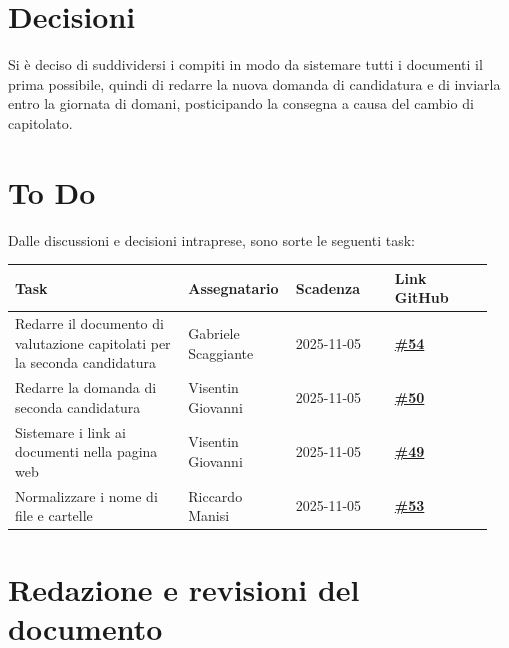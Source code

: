 \documentclass[a4paper,12pt]{article}
\begin{document}
	\section{Decisioni}
	Si \`e deciso di suddividersi i compiti in modo da sistemare tutti i documenti il prima possibile, quindi di redarre la nuova domanda di candidatura e di inviarla entro la giornata di domani, posticipando la consegna a causa del cambio di capitolato.
	
	\section{To Do}
	Dalle discussioni e decisioni intraprese, sono sorte le seguenti task:
	
	\begin{center}
		\small
		\renewcommand{\arraystretch}{1.2} 
		\begin{tabular}{|p{0.35\linewidth}|p{0.2\linewidth}|p{0.2\linewidth}|p{0.2\linewidth}|}
			\hline
			\rowcolor{gray!60} 
			\textbf{Task} & \textbf{Assegnatario} & \textbf{Scadenza} & \textbf{Link GitHub} \\
			\hline
			\rowcolor{white}
			Redarre il documento di valutazione capitolati per la seconda candidatura & Gabriele Scaggiante & 2025-11-05 & \href{https://github.com/SWE-BitByBit/SWE-project/issues/54}{\textbf{\#54}} \\
			\hline
			\rowcolor{gray!20}
			Redarre la domanda di seconda candidatura & Visentin Giovanni & 2025-11-05 & \href{https://github.com/SWE-BitByBit/SWE-project/issues/50}{\textbf{\#50}} \\
			\hline
			\rowcolor{white}
			Sistemare i link ai documenti nella pagina web & Visentin Giovanni & 2025-11-05 & \href{https://github.com/SWE-BitByBit/SWE-project/issues/49}{\textbf{\#49}} \\
			\hline
			\rowcolor{gray!20}
			Normalizzare i nome di file e cartelle & Riccardo Manisi & 2025-11-05 & \href{https://github.com/SWE-BitByBit/SWE-project/issues/53}{\textbf{\#53}} \\
			\hline
		\end{tabular}
	\end{center}
	
	\clearpage
	\section{Redazione e revisioni del documento}
	
\end{document}

